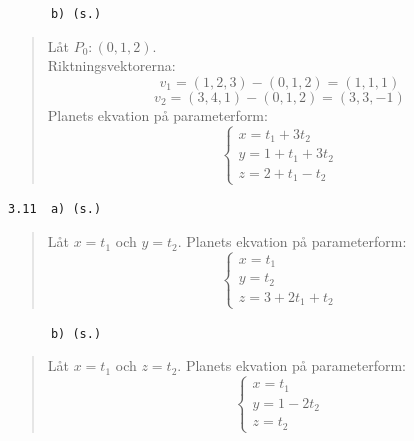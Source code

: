 \documentclass[a4paper]{article}
\newcommand{\tskcol}[1]{\textcolor{tskcol}{#1}}
\begin{document}
\texttt{\tskcol{~~~~~~b) (s.)}}
\begin{quotation}
	\noindent
	Låt $P_0:(0,1,2)$. \\
	Riktningsvektorerna:
	\[v_1=(1,2,3)-(0,1,2)=(1,1,1)\]
	\[v_2=(3,4,1)-(0,1,2)=(3,3,-1)\]
	Planets ekvation på parameterform:
	\[\begin{cases}
	x=t_1+3t_2 \\
	y=1+t_1+3t_2 \\
	z=2+t_1-t_2
	\end{cases}\]
\end{quotation}

\texttt{\tskcol{3.11~~a) (s.)}}
\begin{quotation}
	\noindent
	Låt $x=t_1$ och $y=t_2$. Planets ekvation på parameterform:
	\[\begin{cases}
	x=t_1 \\
	y=t_2 \\
	z=3+2t_1+t_2
	\end{cases}\]
\end{quotation}

\texttt{\tskcol{~~~~~~b) (s.)}}
\begin{quotation}
	\noindent
	Låt $x=t_1$ och $z=t_2$. Planets ekvation på parameterform:
	\[\begin{cases}
	x=t_1 \\
	y=1-2t_2 \\
	z=t_2
	\end{cases}\]
\end{quotation}
\end{document}
